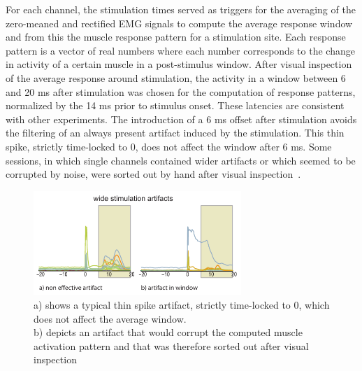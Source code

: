 For each channel, the stimulation times served as triggers for the averaging of the zero-meaned and rectified EMG signals to compute the average response window and from this the muscle response pattern for a stimulation site. Each response pattern is a vector of real numbers where each number corresponds to the change in activity of a certain muscle in a post-stimulus window. After visual inspection of the average response around stimulation, the activity in a window between 6 and 20 ms after stimulation was chosen for the computation of response patterns, normalized by the 14 ms prior to stimulus onset. These latencies are consistent with other experiments\citet{Park:2004p3042}. The introduction of a 6 ms offset after stimulation avoids the filtering of an always present artifact induced by the stimulation. This thin spike, strictly time-locked to 0, does not affect the window after 6 ms. Some sessions, in which single channels contained wider artifacts or which seemed to be corrupted by noise, were sorted out by hand after visual inspection~.
\begin{figure}[ht]
	\centering
		\includegraphics[width=0.7\textwidth]{images/artifacts.pdf}
	\caption{a) shows a typical thin spike artifact, strictly time-locked to 0, which does not affect the average window. \\
	b) depicts an artifact that would corrupt the computed muscle activation pattern and that was therefore sorted out
	after visual inspection}
	\label{sg:fig:images_artifacts}
\end{figure}


